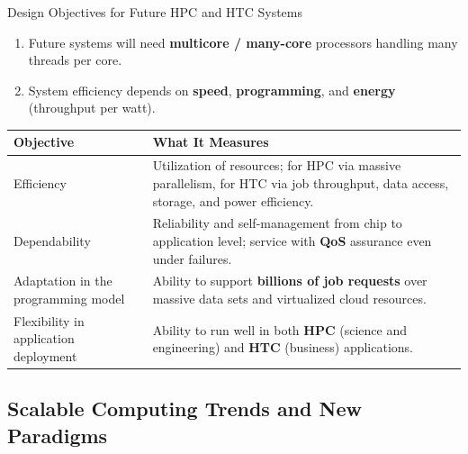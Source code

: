 \begin{frame}{Design Objectives for Future HPC and HTC Systems}
\begin{enumerate}
\item<1-> Future systems will need \textbf{multicore / many-core} processors handling many threads per core.
\item<2-> System efficiency depends on \textbf{speed}, \textbf{programming}, and \textbf{energy} (throughput per watt).
\end{enumerate}
\begin{table}
\centering
\renewcommand{\arraystretch}{1.3}
\scriptsize
\begin{tabular}{|p{3.2cm}|p{10cm}|}
\hline
\textbf{Objective} & \textbf{What It Measures} \\ \hline
Efficiency & Utilization of resources; for HPC via massive parallelism, for HTC via job throughput, data access, storage, and power efficiency. \\ \hline
Dependability & Reliability and self-management from chip to application level; service with \textbf{QoS} assurance even under failures. \\ \hline
Adaptation in the programming model & Ability to support \textbf{billions of job requests} over massive data sets and virtualized cloud resources. \\ \hline
Flexibility in application deployment & Ability to run well in both \textbf{HPC} (science and engineering) and \textbf{HTC} (business) applications. \\ \hline
\end{tabular}
\end{table}
\end{frame}

\subsection{Scalable Computing Trends and New Paradigms}

